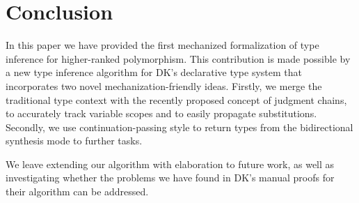 \section{Conclusion}

In this paper we have provided the first mechanized formalization of type
inference for higher-ranked polymorphism. This contribution is made possible by
a new type inference algorithm for DK's declarative type system that
incorporates two novel mechanization-friendly ideas. Firstly, we merge the
traditional type context with the recently proposed concept of judgment chains,
to accurately track variable scopes and to easily propagate substitutions.
Secondly, we use continuation-passing style to return types from the
bidirectional synthesis mode to further tasks. 

We leave extending our algorithm with elaboration to future work, as well as
investigating whether the problems we have found in DK's manual proofs for
their algorithm can be addressed.

